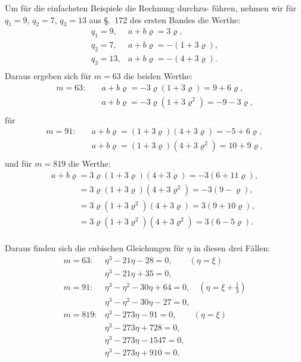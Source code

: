 \documentclass[12pt,a4paper]{article}
\begin{document}
Um f\"ur die einfachsten Beispiele die Rechnung durchzu-
f\"uhren, nehmen wir f\"ur $q_1 = 9$, $q_2 = 7$, $q_3 = 13$ aus \S.~172 des
ersten Bandes die Werthe:
\[\begin{array}{ll}
q_1 = 9, & a + b\varrho = 3\varrho, \\
q_2 = 7, & a + b\varrho = -(1 + 3\varrho), \\
q_3 = 13, & a + b\varrho = -(4 + 3\varrho). \\
\end{array}\]
Daraus ergeben sich f\"ur $m = 63$ die beiden Werthe:
\[\begin{array}{ll}
m = 63{:}\quad & a + b\varrho = -3\varrho(1 + 3\varrho) = 9 + 6\varrho, \\
& a + b\varrho = -3\varrho(1 + 3\varrho^2) = -9 - 3\varrho, \\
\end{array}\]
f\"ur
\[\begin{array}{ll}
m = 91{:}\quad & a + b\varrho = (1 + 3\varrho)(4 + 3\varrho) = -5 + 6\varrho, \\
& a + b\varrho = (1 + 3\varrho)(4 + 3\varrho^2) = 10 + 9\varrho, \\
\end{array}\]
und f\"ur $m = 819$ die Werthe:
\[\begin{array}{l}
a + b\varrho = 3\varrho(1 + 3\varrho)(4 + 3\varrho) = -3(6 + 11\varrho), \\
\phantom{a + b\varrho} = 3\varrho(1 + 3\varrho)(4 + 3\varrho^2) = -3(9 - \varrho), \\
\phantom{a + b\varrho} = 3\varrho(1 + 3\varrho^2)(4 + 3\varrho) = 3(9 + 10\varrho), \\
\phantom{a + b\varrho} = 3\varrho(1 + 3\varrho^2)(4 + 3\varrho^2) = 3(6 - 5\varrho). \\
\end{array}\]

Daraus finden sich die cubischen Gleichungen f\"ur $\eta$ in diesen
drei F\"allen:
\[\begin{array}{ll}
m = 63{:} & \eta^3 - 21\eta - 28 = 0, \qquad (\eta = \xi) \\
& \eta^3 - 21\eta + 35 = 0, \\[4pt]
m = 91{:} & \eta^3 - \eta^2 - 30\eta + 64 = 0,\quad (\eta = \xi + \tfrac{1}{3}) \\
& \eta^3 - \eta^2 - 30\eta - 27 = 0, \\[4pt]
m = 819{:} & \eta^3 - 273\eta - 91 = 0, \qquad (\eta = \xi) \\
& \eta^3 - 273\eta + 728 = 0, \\
& \eta^3 - 273\eta - 1547 = 0, \\
& \eta^3 - 273\eta + 910 = 0. \\
\end{array}\]
\end{document}

